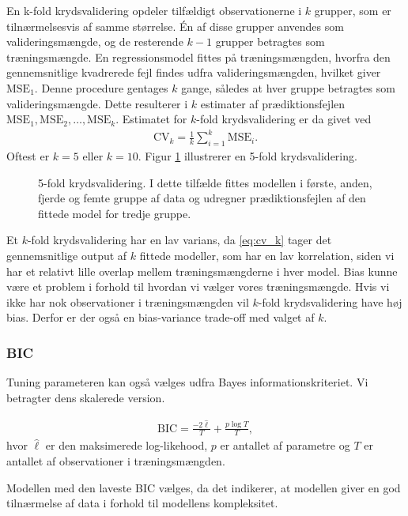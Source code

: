 En k-fold krydsvalidering opdeler tilfældigt observationerne i \(k\) grupper, som er tilnærmelsesvis af samme størrelse.
Én af disse grupper anvendes som valideringsmængde, og de resterende \(k-1\) grupper betragtes som træningsmængde.
En regressionsmodel fittes på træningsmængden, hvorfra den gennemsnitlige kvadrerede fejl findes udfra valideringsmængden, hvilket giver \(\text{MSE}_1\).
Denne procedure gentages \(k\) gange, således at hver gruppe betragtes som valideringsmængde.
Dette resulterer i \(k\) estimater af prædiktionsfejlen $\text{MSE}_1, \text{MSE}_2, \dots , \text{MSE}_k$.
Estimatet for \(k\)-fold krydsvalidering er da givet ved
\begin{align}
\text{CV}_k = \frac{1}{k} \sum_{i=1}^k \text{MSE}_i. \label{eq:cv_k}
\end{align}
Oftest er $k=5$ eller $k = 10$. 
Figur \ref{fig:cv_teori} illustrerer en 5-fold krydsvalidering. 
%
\begin{figure}
\center
\scalebox{0.6}{}
\caption{5-fold krydsvalidering. I dette tilfælde fittes modellen i første, anden, fjerde og femte gruppe af data og udregner prædiktionsfejlen af den fittede model for tredje gruppe.} \label{fig:cv_teori}
\end{figure} 
%
Et $k$-fold krydsvalidering har en lav varians, da \eqref{eq:cv_k} tager det gennemsnitlige output af $k$ fittede modeller, som har en lav korrelation, siden vi har et relativt lille overlap mellem træningsmængderne i hver model. 
Bias kunne være et problem i forhold til hvordan vi vælger vores træningsmængde. Hvis vi ikke har nok observationer i træningsmængden vil $k$-fold krydsvalidering have høj bias. Derfor er der også en bias-variance trade-off med valget af $k$. 

\subsubsection{BIC}
Tuning parameteren kan også vælges udfra Bayes informationskriteriet.
Vi betragter dens skalerede version.
%
\begin{defn} \label{def:bic}
\begin{align*}
\text{BIC} =  \frac{- 2 \widehat{\ell}}{T} + \frac{p \log T}{T}, 
\end{align*}
hvor \(\widehat{\ell}\) er den maksimerede log-likehood, \(p\) er antallet af parametre og \(T\) er antallet af observationer i træningsmængden.
\end{defn} 
%
Modellen med den laveste BIC vælges, da det indikerer, at modellen giver en god tilnærmelse af data i forhold til modellens kompleksitet. 

